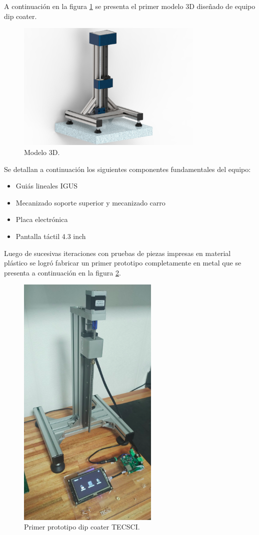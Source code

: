 A continuación en la figura \ref{fig:mecanica_3d_model} se presenta el primer modelo 3D diseñado de equipo dip coater.
\begin{figure}[h]
	\centering
	\includegraphics[width=0.8\textwidth]{./Figures/3d.jpg}
	\caption{Modelo 3D.}
	\label{fig:mecanica_3d_model}
\end{figure}

Se detallan a continuación los siguientes componentes fundamentales del equipo:

\begin{itemize}
\item Guiás lineales IGUS 
\item Mecanizado soporte superior y mecanizado carro
\item Placa electrónica
\item Pantalla táctil 4.3 inch
\end{itemize}

Luego de sucesivas iteraciones con pruebas de piezas impresas en material plástico se logró fabricar un primer prototipo completamente en metal que se presenta a continuación en la figura \ref{fig:mecanica_real_model}.

\begin{figure}[h]
	\centering
	\includegraphics[width=0.6\textwidth]{./Figures/real.png}
	\caption{Primer prototipo dip coater TECSCI.}
	\label{fig:mecanica_real_model}
\end{figure}

